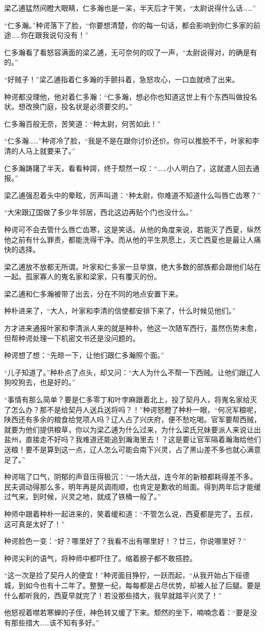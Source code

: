 梁乙逋猛然间瞪大眼睛，仁多瀚也是一呆，半天后才干笑，“太尉说得什么话……”

“仁多瀚。”种谔落下了脸，“你要想清楚，你的每一句话，都会影响到你仁多家的前途……你在跟我说句没有！”

仁多瀚看了看怒容满面的梁乙逋，无可奈何的叹了一声，“太尉说得对，的确是有的。”

“好贼子！”梁乙逋指着仁多瀚的手颤抖着，急怒攻心，一口血就喷了出来。

种谔都没理他，他对着仁多瀚：“仁多瀚，想必你也知道这世上有个东西叫做投名状。想改换门庭，投名状是必须要交的。”

仁多瀚百般无奈，苦笑道：“种太尉，何苦如此！”

“仁多瀚……”种谔冷了脸，“我是不是在跟你讨价还价。你可以推脱不干，叶家和李清的人马上就要来了。”

仁多瀚踌躇了半天，看看种諤，终于颓然一叹：“……小人明白了，这就遣人回去通报。”

梁乙逋强忍着头中的晕眩，厉声叫道：“种太尉，你难道不知道什么叫唇亡齿寒？”

“大宋跟辽国做了多少年邻居，西北这边再贴个门也没什么。”

种谔可不会去管什么唇亡齿寒，这是笑话。从他的角度来说，若能灭了西夏，纵然他之前有什么罪责，都能洗得干净。而从他的平生夙愿上，灭亡西夏也是最让人痛快的选择。

梁乙逋放不放都无所谓。叶家和仁多家一旦举旗，绝大多数的部族都会跟他们站在一起。孤家寡人的嵬名家和梁家，只有覆灭的份。

梁乙逋和仁多瀚被带了出去，分在不同的地点安置下来。

种朴进来了，“大人，叶家和李清的信使都安排下来了，什么时候见他们。”

方才进来通报叶家和李清派人来的就是种朴。他这一次随军西行，虽然伤势未愈，但帮种谔处理一下机密文书还是没问题的。

种谔想了想：“先晾一下，让他们跟仁多瀚照个面。”

“儿子知道了。”种朴点了点头，却又问：“大人为什么不帮一下西贼。让他们跟辽人狗咬狗去，也是好的。”

“事情有那么简单？要是仁多零丁和叶孛麻跟着北上，投了契丹人，将嵬名家给灭了怎么办？那不是给契丹人送兵送将吗？！”种谔怒瞪了种朴一眼，“何况军粮呢，陕西还有多余的粮食给党项人吗？辽人占了兴庆府，便不愁吃喝。官军要帮西贼，就要为他们提供粮草，你以为梁乙逋为什么过来，为什么梁氏兄妹要派人来说让出盐州，直接走不好吗？我难道还能追到瀚海里去！？这是要让官军隔着瀚海给他们送粮！要不是算到这一点，辽人怎么可能会南下兴灵，占了黑山差不多也就心满意足了。”

种谔喘了口气，阴郁的声音压得极沉：“一场大战，连今年的新粮都耗得差不多。民夫调动得那么多，明年再是风调雨顺，也肯定是歉收的局面。得到两年后才能缓过气来。到时候，兴灵之地，就成了铁桶一般了。”

种师中跟着种朴一起进来的，笑着缓和道：“不管怎么说，西夏都是完了。五叔，这可真是太好了！”

种谔脸色一变：“好？哪里好了？我看不出有哪里好！？廿三，你说哪里好？”

种谔尖利的语气，将种师中都吓住了。缩着膀子都不敢搭腔。

“这一次是捡了契丹人的便宜！”种谔面目狰狞，一跃而起，“从我开始占下绥德城，到如今也有十二年了。整整一纪，每每都是占尽优势，却被人扯了后腿。要是什么都听我的，西夏早就完了！若没那些措大，我早就踏平兴灵了！”

他怒视着噤若寒蝉的子侄，神色转又缓了下来。颓然的坐下，喃喃念着：“要是没有那些措大……该不知有多好。”

